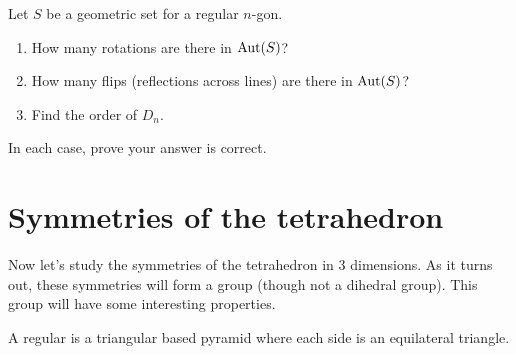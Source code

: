 \documentclass{ximera}
\begin{document}
\begin{exercise}\label{E:D2n}
  Let $S$ be a geometric set for a regular $n$-gon.
  \begin{enumerate}
  \item How many rotations are there in $\operatorname{Aut}(S)$? 
  \item How many flips (reflections across lines) are there in
    $\operatorname{Aut}(S)$?
  \item Find the order of $D_n$. 
  \end{enumerate}
  In each case, prove your answer is correct.
\end{exercise}





\section{Symmetries of the tetrahedron}

Now let's study the symmetries of the tetrahedron in $3$ dimensions.
As it turns out, these symmetries will form a group (though not a
dihedral group). This group will have some interesting properties.


A regular  is a triangular based pyramid where each
side is an equilateral triangle.
\end{document}
